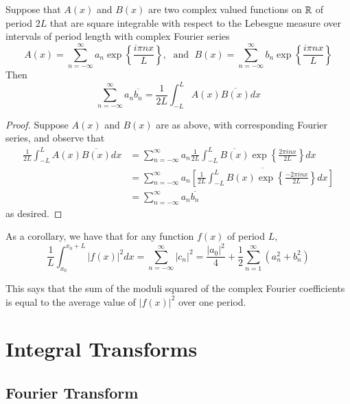 \documentclass[12pt, a4paper, oneside, openright, titlepage]{book}
\begin{document}
\begin{namthm}
    Suppose that $A(x)$ and $B(x)$ are two complex valued functions on $\mathbb R$ of period $2L$ that are square integrable with respect to the Lebesgue measure over intervals of period length with complex Fourier series\begin{equation*}
        A(x) = \sum_{n=-\infty}^{\infty}a_n\exp\left\{\frac{i\pi nx}{L}\right\},\;\text{ and }\;B(x) = \sum_{n=-\infty}^{\infty}b_n\exp\left\{\frac{i\pi nx}{L}\right\}
    \end{equation*}
    Then \begin{equation}
        \sum_{n=-\infty}^{\infty}a_n\overline{b_n} = \frac{1}{2L}\int_{-L}^LA(x)\overline{B(x)}dx
    \end{equation}
\end{namthm}
\begin{proof}
    Suppose $A(x)$ and $B(x)$ are as above, with corresponding Fourier series, and observe that \begin{align*}
        \frac{1}{2L}\int_{-L}^LA(x)\overline{B(x)}dx &= \sum_{n=-\infty}^{\infty}a_n\frac{1}{2L}\int_{-L}^L\overline{B(x)}\exp\left\{\frac{2\pi inx}{2L}\right\}dx \\
        &= \sum_{n=-\infty}^{\infty}a_n\overline{\left[\frac{1}{2L}\int_{-L}^LB(x)\exp\left\{\frac{-2\pi inx}{2L}\right\}dx\right]} \\
        &= \sum_{n=-\infty}^{\infty}a_n\overline{b_n}
    \end{align*}
    as desired.
\end{proof}

As a corollary, we have that for any function $f(x)$ of period $L$, \begin{equation*}
    \frac{1}{L}\int_{x_0}^{x_0+L}|f(x)|^2dx = \sum_{n=-\infty}^{\infty}|c_n|^2 = \frac{|a_0|^2}{4} + \frac{1}{2}\sum_{n=1}^{\infty}(a_n^2+b_n^2)
\end{equation*}

This says that the sum of the moduli squared of the complex Fourier coefficients is equal to the average value of $|f(x)|^2$ over one period. 



\chapter{Integral Transforms}


\section{Fourier Transform}
\end{document}
